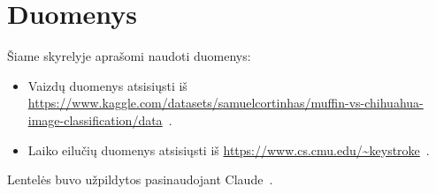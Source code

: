 \section{Duomenys}
\label{sec:Duomenys}

Šiame skyrelyje aprašomi naudoti duomenys:
\begin{itemize}
    \item Vaizdų duomenys atsisiųsti iš \url{https://www.kaggle.com/datasets/samuelcortinhas/muffin-vs-chihuahua-image-classification/data}~\cite{muffin_vs_chihuahua}.
    \item Laiko eilučių duomenys atsisiųsti iš \url{https://www.cs.cmu.edu/~keystroke}~\cite{keystroke_dynamics}.
\end{itemize}
Lentelės buvo užpildytos pasinaudojant Claude~\cite{claude_bendrai}.

